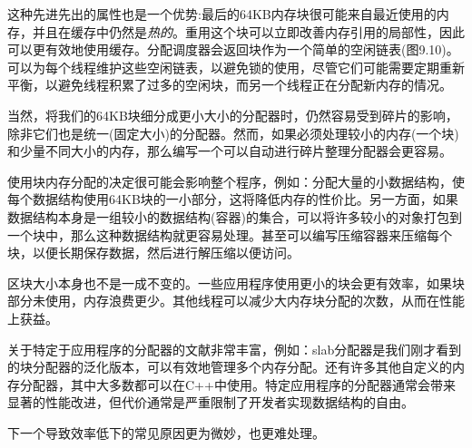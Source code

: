 这种先进先出的属性也是一个优势:最后的64KB内存块很可能来自最近使用的内存，并且在缓存中仍然是\textit{热的}。重用这个块可以立即改善内存引用的局部性，因此可以更有效地使用缓存。分配调度器会返回块作为一个简单的空闲链表(图9.10)。可以为每个线程维护这些空闲链表，以避免锁的使用，尽管它们可能需要定期重新平衡，以避免线程积累了过多的空闲块，而另一个线程正在分配新内存的情况。

当然，将我们的64KB块细分成更小大小的分配器时，仍然容易受到碎片的影响，除非它们也是统一(固定大小)的分配器。然而，如果必须处理较小的内存(一个块)和少量不同大小的内存，那么编写一个可以自动进行碎片整理分配器会更容易。 

使用块内存分配的决定很可能会影响整个程序，例如：分配大量的小数据结构，使每个数据结构使用64KB块的一小部分，这将降低内存的性价比。另一方面，如果数据结构本身是一组较小的数据结构(容器)的集合，可以将许多较小的对象打包到一个块中，那么这种数据结构就更容易处理。甚至可以编写压缩容器来压缩每个块，以便长期保存数据，然后进行解压缩以便访问。 

区块大小本身也不是一成不变的。一些应用程序使用更小的块会更有效率，如果块部分未使用，内存浪费更少。其他线程可以减少大内存块分配的次数，从而在性能上获益。

关于特定于应用程序的分配器的文献非常丰富，例如：slab分配器是我们刚才看到的块分配器的泛化版本，可以有效地管理多个内存分配。还有许多其他自定义的内存分配器，其中大多数都可以在C++中使用。特定应用程序的分配器通常会带来显著的性能改进，但代价通常是严重限制了开发者实现数据结构的自由。

下一个导致效率低下的常见原因更为微妙，也更难处理。





















